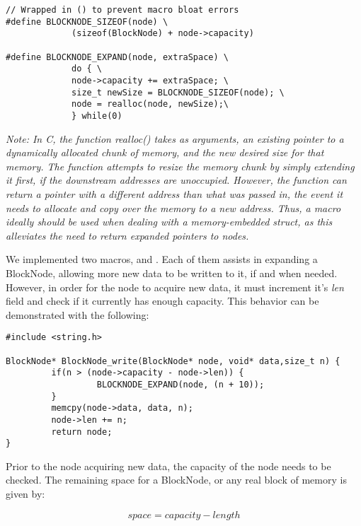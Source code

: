 \begin{lstlisting}[style=numc]
// Wrapped in () to prevent macro bloat errors
#define BLOCKNODE_SIZEOF(node) \ 
             (sizeof(BlockNode) + node->capacity)

#define BLOCKNODE_EXPAND(node, extraSpace) \
             do { \
             node->capacity += extraSpace; \
             size_t newSize = BLOCKNODE_SIZEOF(node); \
             node = realloc(node, newSize);\
             } while(0)

\end{lstlisting}
\emph{Note: In C, the function realloc() takes as arguments, an existing pointer to a dynamically allocated chunk of memory, and the new desired size for that memory. The function attempts to resize the memory chunk  by simply extending it first, if the downstream addresses are unoccupied. However, the function can return a pointer with a different address than what was passed in, the event it needs to allocate and copy over the memory to a new address. Thus, a macro ideally should be used when dealing with a memory-embedded struct, as this alleviates the need to return expanded pointers to nodes.} \\

\par We implemented two macros,  and . Each of them assists in expanding a BlockNode, allowing more new data to be written to it, if and when needed. However, in order for the node to acquire new data, it must increment it's \emph{len} field and check if it currently has enough capacity. This behavior can be demonstrated with the following:


\begin{lstlisting}[style=numc]
#include <string.h>

BlockNode* BlockNode_write(BlockNode* node, void* data,size_t n) {
         if(n > (node->capacity - node->len)) {
                  BLOCKNODE_EXPAND(node, (n + 10));
         }
         memcpy(node->data, data, n);
         node->len += n;
         return node;
}

\end{lstlisting}

\par Prior to the node acquiring new data, the capacity of the node needs to be checked. The remaining space for a BlockNode, or any real block of memory is given by: 

$$
space = capacity - length
$$

